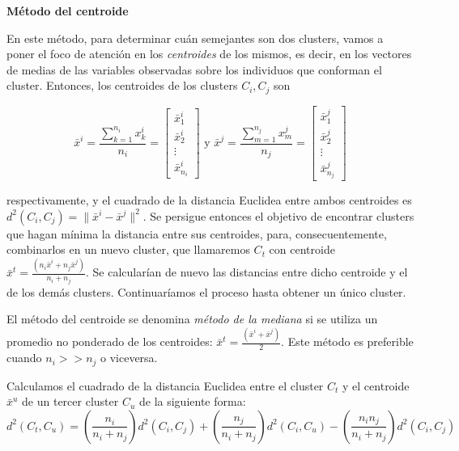 \vspace{0.5cm}

\textbf{Método del centroide} \newline  %

En este método, para determinar cuán semejantes son dos clusters, vamos a poner el foco de atención en los \textit{centroides} de los mismos, es decir, en los vectores de medias de las variables 
observadas sobre los individuos que conforman el cluster. Entonces, los centroides de los clusters $C_{i},C_{j}$ son

\[
\bar{x}^{i} = \frac{\sum_{k=1}^{n_{i}}x^{i}_{k}}{n_{i}} = \begin{bmatrix} \bar{x}^{i}_{1} \\  \bar{x}^{i}_{2} \\ \vdots \\ \bar{x}^{i}_{n_{i}} \end{bmatrix} \text{ y } \bar{x}^{j} = \frac{\sum_{m=1}^{n_{j}}x^{j}_{m}}{n_{j}} = \begin{bmatrix} \bar{x}^{j}_{1} \\  \bar{x}^{j}_{2} \\ \vdots \\ \bar{x}^{j}_{n_{j}} \end{bmatrix} 
\]

respectivamente, y el cuadrado de la distancia Euclidea entre ambos centroides es $d^{2}(C_{i},C_{j}) = \|\bar{x}^{i} - \bar{x}^{j}\|^{2}$. Se persigue entonces el objetivo de encontrar clusters que hagan mínima la 
distancia entre sus centroides, para, consecuentemente, combinarlos en un nuevo cluster, que llamaremos $C_{t}$ con centroide $\bar{x}^{t} = \frac{(n_{i}\bar{x}^{i} + n_{j}\bar{x}^{j})}{n_{i}+n_{j}}$. Se calcularían 
de nuevo las distancias entre dicho centroide y el de los demás clusters. Continuaríamos el proceso hasta obtener un único cluster.\newline

El método del centroide se denomina \textit{método de la mediana} si se utiliza un promedio no ponderado de los centroides: $\bar{x}^{t} = \frac{(\bar{x}^{i} +\bar{x}^{j})}{2}$. Este método es preferible cuando $n_{i} >> n_{j}$ o
viceversa. \newline

Calculamos el cuadrado de la distancia Euclidea entre el cluster $C_{t}$ y el centroide $\bar{x}^{u}$ de un tercer cluster $C_{u}$ de la siguiente forma:
\[
d^{2}(C_{t}, C_{u}) = \left( \frac{n_{i}}{n_{i} + n_{j}} \right) d^{2}(C_{i},C_{j}) + \left (\frac{n_{j}}{n_{i} + n_{j}}\right) d^{2}(C_{i},C_{u}) - \left( \frac{n_{i}n_{j}}{n_{i} + n_{j}}\right) d^{2}(C_{i},C_{j})
\]

